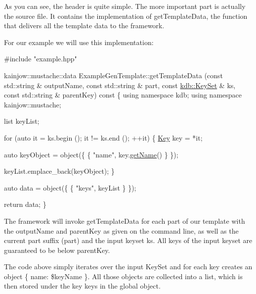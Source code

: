 As you can see, the header is quite simple. The more important part is actually the source file. It contains the implementation of {\ttfamily get\+Template\+Data}, the function that delivers all the template data to the framework.

For our example we will use this implementation\+:


\begin{DoxyCode}
\textcolor{preprocessor}{#include "example.hpp"}

kainjow::mustache::data ExampleGenTemplate::getTemplateData (\textcolor{keyword}{const} std::string & outputName, \textcolor{keyword}{const} 
      std::string & part,
                                                             \textcolor{keyword}{const} \hyperlink{classkdb_1_1KeySet}{kdb::KeySet} & ks, \textcolor{keyword}{const} 
      std::string & parentKey)\textcolor{keyword}{ const}
\textcolor{keyword}{}\{
    \textcolor{keyword}{using namespace }kdb;
    \textcolor{keyword}{using namespace }kainjow::mustache;

    list keyList;

    \textcolor{keywordflow}{for} (\textcolor{keyword}{auto} it = ks.begin (); it != ks.end (); ++it)
    \{
        \hyperlink{classkdb_1_1Key}{Key} key = *it;

        \textcolor{keyword}{auto} keyObject = object(\{ \{ \textcolor{stringliteral}{"name"}, key.\hyperlink{classkdb_1_1Key_a6c1812730e9cb714893c9f9b1e503303}{getName}() \} \});

        keyList.emplace\_back(keyObject);
    \}

    \textcolor{keyword}{auto} data = object(\{ \{ \textcolor{stringliteral}{"keys"}, keyList \} \});

    \textcolor{keywordflow}{return} data;
\}
\end{DoxyCode}


The framework will invoke {\ttfamily get\+Template\+Data} for each part of our template with the {\ttfamily output\+Name} and {\ttfamily parent\+Key} as given on the command line, as well as the current part suffix ({\ttfamily part}) and the input keyset {\ttfamily ks}. All keys of the input keyset are guaranteed to be below {\ttfamily parent\+Key}.

The code above simply iterates over the input Key\+Set and for each key creates an object {\ttfamily \{ name\+: \$key\+Name \}}. All those objects are collected into a list, which is then stored under the key {\ttfamily keys} in the global object.

